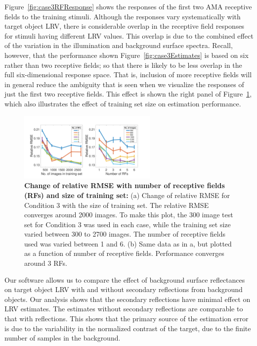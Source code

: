 \documentclass{jov}
\begin{document}
Figure~\ref{fig:case3RFResponse} shows the responses of the first two AMA receptive fields to the training stimuli.
Although the responses vary systematically with target object LRV, there is considerable overlap in the receptive field responses for stimuli having different LRV values.
This overlap is due to the combined effect of the variation in the illumination and background surface spectra.
Recall, however, that the performance shown Figure~\ref{fig:case3Estimates} is based on six rather than two receptive fields;
so that there is likely to be less overlap in the full six-dimensional response space.
That is, inclusion of more receptive fields will in general reduce the ambiguity that is seen when we visualize the responses of just the first two receptive fields.
This effect is shown the right panel of Figure~\ref{fig:RMSEvsRF}, which also illustrates the effect of training set size on estimation performance. 

\begin{figure}
\centering
\includegraphics[width=0.6\textwidth]{../FiguresDraft5/Figure13/Figure13.pdf}
\caption{{\bf Change of relative RMSE with number of receptive fields (RFs) and size of training set:} (a) Change of relative RMSE for Condition 3 with the size of training set. The relative RMSE converges around 2000 images. To make this plot, the 300 image test set for Condition 3 was used in each case, while the training set size varied between 300 to 2700 images. The number of receptive fields used was varied between 1 and 6. (b) Same data as in a, but plotted as a function of number of receptive fields. Performance converges around 3 RFs.}
 \label{fig:RMSEvsRF}
\end{figure}

Our software allows us to compare the effect of background surface reflectances on target object LRV with and without secondary reflections from background objects. 
Our analysis shows that the secondary reflections have minimal effect on LRV estimates.
The estimates without secondary reflections are comparable to that with reflections.
This shows that the primary source of the estimation error is due to the variability in the normalized contrast of the target, due to the 
finite number of samples in the background.
\end{document}
